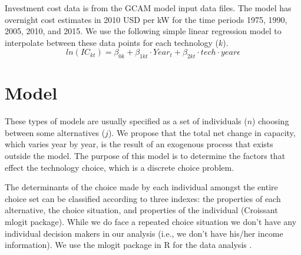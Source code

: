 \documentclass[10pt]{amsart}
\begin{document}
Investment cost data is from the GCAM model input data files.
The model has overnight cost estimates in 2010 USD per kW for the time periods 1975, 1990, 2005, 2010, and 2015. 
We use the following simple linear regression model to interpolate between these data points for each technology ($k$). 
\begin{equation}
ln(IC_{kt}) = \beta_{0k} + \beta_{1kt} \cdot Year_{t} + \beta_{2kt} \cdot tech \cdot year \epsilon
\end{equation}

\newpage
{}
\begin{landscape}
\end{landscape}
\restoregeometry

\newpage
\section{Model}
These types of models are usually specified as a set of individuals ($n$) choosing between some alternatives ($j$).
We propose that the total net change in capacity, which varies year by year, is the result of an exogenous process that exists outside the model. 
The purpose of this model is to determine the factors that effect the technology choice, which is a discrete choice problem.

The determinants of the choice made by each individual amongst the entire choice set can be classified according to three indexes: the properties of each alternative, the choice situation, and properties of the individual \cite{}(Croissant mlogit package). 
While we do face a repeated choice situation we don't have any individual decision makers in our analysis (i.e., we don't have his/her income information). 
We use the mlogit package in R for the data analysis \parencite{mlogit2013}. 
\end{document}
